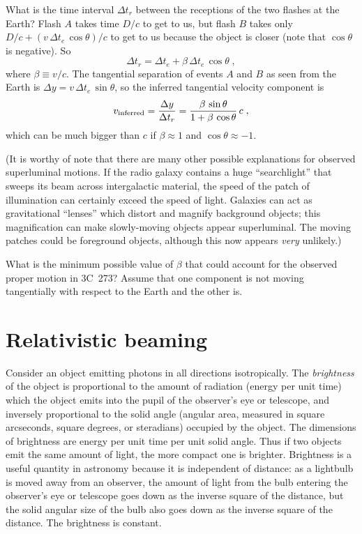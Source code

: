 What is the time interval $\Delta t_r$ between the receptions of the
two flashes at the Earth?  Flash $A$ takes time $D/c$ to get to us,
but flash $B$ takes only $D/c+(v\,\Delta t_e\,\cos\theta)/c$ to get to
us because the object is closer (note that $\cos\theta$ is negative).
So
\begin{equation}
\Delta t_r = \Delta t_e + \beta\,\Delta t_e\,\cos\theta \; ,
\end{equation}
where $\beta\equiv v/c$.  The tangential separation of events $A$ and
$B$ as seen from the Earth is $\Delta y = v\,\Delta t_e\,\sin\theta$,
so the inferred tangential velocity component is
\begin{equation}
v_{\rm inferred} = \frac{\Delta y}{\Delta t_r}
= \frac{\beta\,\sin\theta}{1+\beta\,\cos\theta}\,c \; ,
\end{equation}
which can be much bigger than $c$ if $\beta\approx 1$ and
$\cos\theta\approx -1$.

(It is worthy of note that there are many other possible explanations
for observed superluminal motions.  If the radio galaxy contains a
huge ``searchlight'' that sweeps its beam across intergalactic
material, the speed of the patch of illumination can certainly exceed
the speed of light.  Galaxies can act as gravitational ``lenses''
which distort and magnify background objects; this magnification can
make slowly-moving objects appear superluminal.  The moving patches
could be foreground objects, although this now appears {\em very\/}
unlikely.)

\begin{problem}
What is the minimum possible value of $\beta$ that could account
for the observed proper motion in 3C~273?  Assume that one component is
not moving tangentially with respect to the Earth and the other is.
\end{problem}


\section{Relativistic beaming}
\label{sec:beaming}

Consider an object emitting photons in all directions isotropically.
The {\em brightness\/} of the object is proportional to the amount of
radiation (energy per unit time) which the object emits into the pupil
of the observer's eye or telescope, and inversely proportional to the
solid angle (angular area, measured in square arcseconds, square
degrees, or steradians) occupied by the object.  The dimensions of
brightness are energy per unit time per unit solid angle.  Thus if two
objects emit the same amount of light, the more compact one is
brighter.  Brightness is a useful quantity in astronomy because it is
independent of distance: as a lightbulb is moved away from an
observer, the amount of light from the bulb entering the observer's
eye or telescope goes down as the inverse square of the distance, but
the solid angular size of the bulb also goes down as the inverse
square of the distance.  The brightness is constant.

